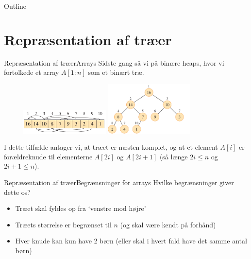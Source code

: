 \documentclass[aspectratio=1610]{beamer}
\begin{document}
\begin{frame}{Outline}
  \tableofcontents
\end{frame}


\section{Repræsentation af træer}

\begin{frame}{Repræsentation af træer}{Arrays}
    Sidste gang så vi på \alert{binære heaps}, hvor vi fortolkede et array
    $A[1:n]$ som et binært træ.

    \pause

    \begin{figure}[h]
        \centering
        \includegraphics[width=0.4\textwidth]{heaps/array}
        \includegraphics[width=0.4\textwidth]{heaps/tree}
    \end{figure}

    \pause

    I dette tilfælde antager vi, at træet er \alert{næsten komplet}, og at et
    element $A[i]$ er forældreknude til elementerne $A[2i]$ og $A[2i + 1]$ (så
    længe $2i \leq n$ og $2i + 1 \leq n$).
\end{frame}


\begin{frame}{Repræsentation af træer}{Begrænsninger for arrays}
    Hvilke begrænsninger giver dette os?

    \begin{itemize}[<+->]
        \item<2-> Træet \alert{skal} fyldes op fra `venstre mod højre'
        \item<3-> Træets størrelse er begrænset til $n$ (og skal være kendt på
            forhånd)
        \item<4-> Hver knude kan kun have 2 børn (eller skal i hvert fald have
            det samme antal børn)
    \end{itemize}

\end{frame}
\end{document}
